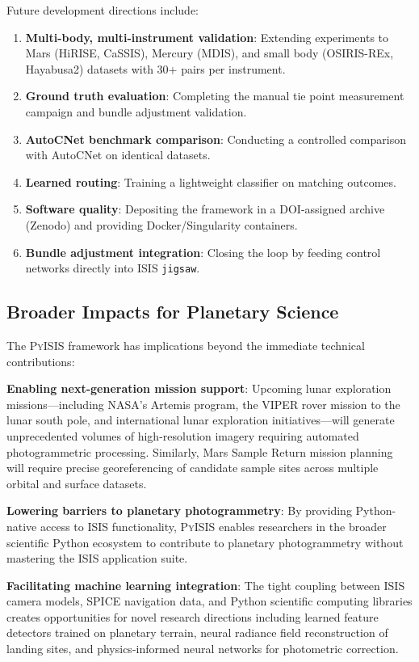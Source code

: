 \documentclass[lettersize,journal]{IEEEtran}
\newcommand{\pyisis}{\textsc{PyISIS}}
\begin{document}
Future development directions include:

\begin{enumerate}
    \item \textbf{Multi-body, multi-instrument validation}: Extending experiments to Mars (HiRISE, CaSSIS), Mercury (MDIS), and small body (OSIRIS-REx, Hayabusa2) datasets with 30+ pairs per instrument.
    \item \textbf{Ground truth evaluation}: Completing the manual tie point measurement campaign and bundle adjustment validation.
    \item \textbf{AutoCNet benchmark comparison}: Conducting a controlled comparison with AutoCNet on identical datasets.
    \item \textbf{Learned routing}: Training a lightweight classifier on matching outcomes.
    \item \textbf{Software quality}: Depositing the framework in a DOI-assigned archive (Zenodo) and providing Docker/Singularity containers.
    \item \textbf{Bundle adjustment integration}: Closing the loop by feeding control networks directly into ISIS \texttt{jigsaw}.
\end{enumerate}

\subsection{Broader Impacts for Planetary Science}

The \pyisis{} framework has implications beyond the immediate technical contributions:

\textbf{Enabling next-generation mission support}: Upcoming lunar exploration missions---including NASA's Artemis program, the VIPER rover mission to the lunar south pole, and international lunar exploration initiatives---will generate unprecedented volumes of high-resolution imagery requiring automated photogrammetric processing. Similarly, Mars Sample Return mission planning will require precise georeferencing of candidate sample sites across multiple orbital and surface datasets.

\textbf{Lowering barriers to planetary photogrammetry}: By providing Python-native access to ISIS functionality, \pyisis{} enables researchers in the broader scientific Python ecosystem to contribute to planetary photogrammetry without mastering the ISIS application suite.

\textbf{Facilitating machine learning integration}: The tight coupling between ISIS camera models, SPICE navigation data, and Python scientific computing libraries creates opportunities for novel research directions including learned feature detectors trained on planetary terrain, neural radiance field reconstruction of landing sites, and physics-informed neural networks for photometric correction.
\end{document}
